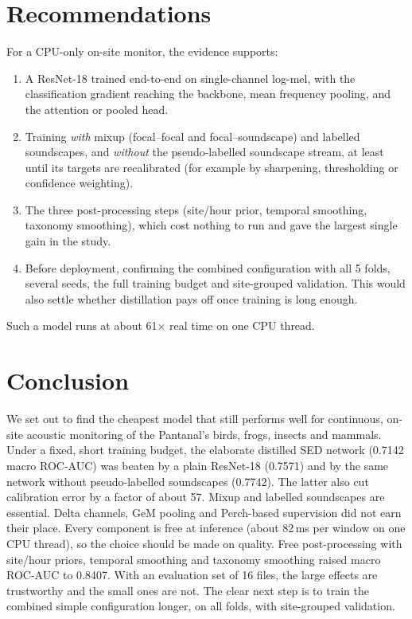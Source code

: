 \documentclass[11pt]{article}
\begin{document}
\section{Recommendations}
\label{sec:recommend}
For a CPU-only on-site monitor, the evidence supports:
\begin{enumerate}
  \item A ResNet-18 trained end-to-end on single-channel log-mel, with the
        classification gradient reaching the backbone, mean frequency pooling,
        and the attention or pooled head.
  \item Training \emph{with} mixup (focal--focal and focal--soundscape) and
        labelled soundscapes, and \emph{without} the pseudo-labelled
        soundscape stream, at least until its targets are recalibrated (for
        example by sharpening, thresholding or confidence weighting).
  \item The three post-processing steps (site/hour prior, temporal
        smoothing, taxonomy smoothing), which cost nothing to run and gave the
        largest single gain in the study.
  \item Before deployment, confirming the combined configuration with all 5
        folds, several seeds, the full training budget and site-grouped
        validation. This would also settle whether distillation pays off once
        training is long enough.
\end{enumerate}
Such a model runs at about 61$\times$ real time on one CPU thread.

\section{Conclusion}
We set out to find the cheapest model that still performs well for
continuous, on-site acoustic monitoring of the Pantanal's birds, frogs,
insects and mammals. Under a fixed, short training budget, the elaborate
distilled SED network (0.7142 macro ROC-AUC) was beaten by a plain ResNet-18
(0.7571) and by the same network without pseudo-labelled soundscapes
(0.7742). The latter also cut calibration error by a factor of about 57.
Mixup and labelled soundscapes are essential. Delta channels, GeM pooling and
Perch-based supervision did not earn their place. Every component is free at
inference (about 82\,ms per window on one CPU thread), so the choice should be
made on quality. Free post-processing with site/hour priors, temporal
smoothing and taxonomy smoothing raised macro ROC-AUC to 0.8407. With an
evaluation set of 16 files, the large effects are trustworthy and the small
ones are not. The clear next step is to train the combined simple
configuration longer, on all folds, with site-grouped validation.
\end{document}
